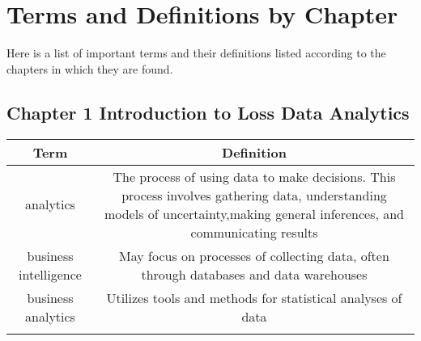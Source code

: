 \documentclass[]{book}
\theoremstyle{definition}
\theoremstyle{definition}
\theoremstyle{definition}
\theoremstyle{remark}
\begin{document}
\section{Terms and Definitions by
Chapter}\label{terms-and-definitions-by-chapter}

Here is a list of important terms and their definitions listed according
to the chapters in which they are found.

\subsection{Chapter 1 Introduction to Loss Data
Analytics}\label{chapter-1-introduction-to-loss-data-analytics}

\begin{longtable}[]{@{}cc@{}}
\toprule
\begin{minipage}[b]{0.41\columnwidth}\centering\strut
Term\strut
\end{minipage} & \begin{minipage}[b]{0.42\columnwidth}\centering\strut
Definition\strut
\end{minipage}\tabularnewline
\midrule
\endhead
\begin{minipage}[t]{0.41\columnwidth}\centering\strut
analytics\strut
\end{minipage} & \begin{minipage}[t]{0.42\columnwidth}\centering\strut
The process of using data to make decisions. This process involves
gathering data, understanding models of uncertainty,making general
inferences, and communicating results\strut
\end{minipage}\tabularnewline
\begin{minipage}[t]{0.41\columnwidth}\centering\strut
business intelligence\strut
\end{minipage} & \begin{minipage}[t]{0.42\columnwidth}\centering\strut
May focus on processes of collecting data, often through databases and
data warehouses\strut
\end{minipage}\tabularnewline
\begin{minipage}[t]{0.41\columnwidth}\centering\strut
business analytics\strut
\end{minipage} & \begin{minipage}[t]{0.42\columnwidth}\centering\strut
Utilizes tools and methods for statistical analyses of data\strut
\end{minipage}\tabularnewline
\begin{minipage}[t]{0.41\columnwidth}\centering\strut

\end{minipage}
\end{longtable}
\end{document}
